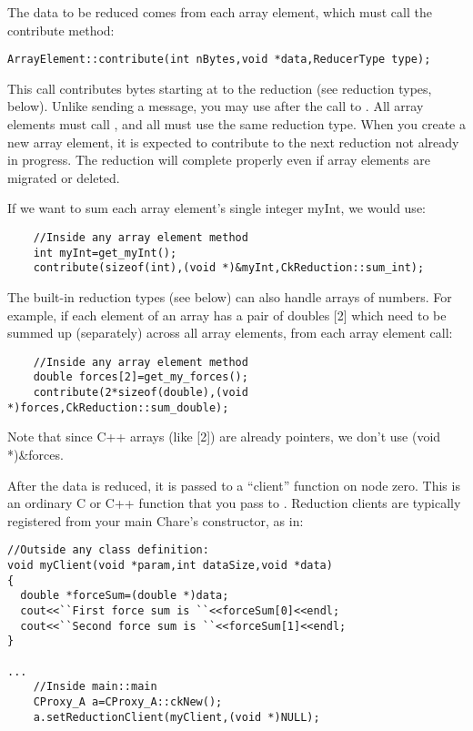 The data to be reduced comes from each array element, which must call the contribute method:
\begin{verbatim}
ArrayElement::contribute(int nBytes,void *data,ReducerType type);
\end{verbatim}

This call contributes  bytes starting at  to the
reduction  (see reduction types, below).  Unlike sending a
message, you may use  after the call to .  All
array elements must call , and all must use the same
reduction type.  When you create a new array element, it is expected
to contribute to the next reduction not already in progress.  The
reduction will complete properly even if array elements are migrated
or deleted.

If we want to sum each array element's single integer myInt, we would use:
\begin{verbatim}
    //Inside any array element method
    int myInt=get_myInt();
    contribute(sizeof(int),(void *)&myInt,CkReduction::sum_int);
\end{verbatim}

The built-in reduction types (see below) can also handle arrays of
numbers.  For example, if each element of an array has a pair of
doubles [2] which need to be summed up (separately) across
all array elements, from each array element call:
\begin{verbatim}
    //Inside any array element method
    double forces[2]=get_my_forces();
    contribute(2*sizeof(double),(void *)forces,CkReduction::sum_double);
\end{verbatim}
Note that since C++ arrays (like [2]) are already pointers, we don't use (void *)\&forces.


After the data is reduced, it is passed to a ``client'' function on
node zero.  This is an ordinary C or C++ function that you pass to
.  Reduction clients are
typically registered from your main Chare's constructor, as in:

\begin{verbatim}
//Outside any class definition:
void myClient(void *param,int dataSize,void *data)
{
  double *forceSum=(double *)data;
  cout<<``First force sum is ``<<forceSum[0]<<endl;
  cout<<``Second force sum is ``<<forceSum[1]<<endl;
}

...
    //Inside main::main
    CProxy_A a=CProxy_A::ckNew();
    a.setReductionClient(myClient,(void *)NULL);
\end{verbatim}

